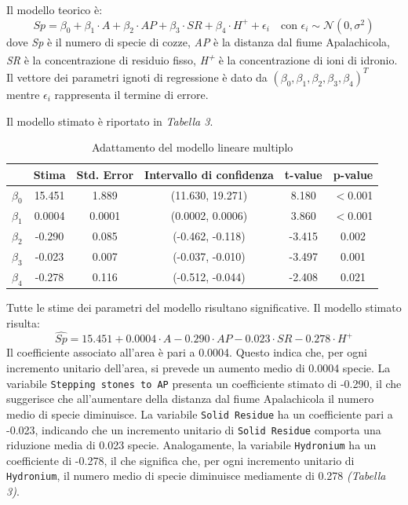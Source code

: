 \documentclass{article} %
\begin{document}
Il modello teorico è:
\[
Sp =\beta_0+\beta_1 \cdot A+\beta_2\cdot AP +\beta_3\cdot SR+\beta_4\cdot H^+ +\epsilon_i \quad \text{con } \epsilon_i \sim \mathcal{N}(0,\sigma^2)
\]
dove \textit{Sp} è il numero di specie di cozze, \textit{AP} è la distanza dal fiume Apalachicola, \textit{SR} è la concentrazione di residuio fisso, \textit{H\textsuperscript{+}} è la concentrazione di ioni di idronio. Il vettore dei parametri ignoti di regressione è dato da $(\beta_0,\beta_1,\beta_2,\beta_3,\beta_4)^T$ mentre $\epsilon_i$ rappresenta il termine di errore. 

Il modello stimato è riportato in \textit{Tabella 3}.

\begin{table}[H]
    \centering
    \renewcommand{\arraystretch}{1.4} %
    \begin{tabular}{lccccc}
        \toprule
        &  Stima &  Std. Error &  Intervallo di confidenza & t-value &  p-value \\
        \midrule  
        $\beta_0$ & 15.451   & 1.889  & (11.630, 19.271) & 8.180  & $<$0.001 \\
        $\beta_1$ & 0.0004   & 0.0001 & (0.0002, 0.0006) & 3.860    & $<$0.001  \\
        $\beta_2$ & -0.290   & 0.085  & (-0.462, -0.118)  & -3.415 & 0.002 \\
        $\beta_3$ & -0.023   & 0.007  & (-0.037, -0.010) & -3.497 & 0.001  \\
        $\beta_4$ & -0.278   & 0.116  & (-0.512, -0.044) & -2.408 & 0.021 \\
        \bottomrule
    \end{tabular}
    \caption{Adattamento del modello lineare multiplo}
\end{table}
Tutte le stime dei parametri del modello risultano significative. 
Il modello stimato risulta:
\[
\hat{Sp}=15.451+0.0004 \cdot A-0.290\cdot AP -0.023\cdot SR-0.278\cdot H^+
\]
Il coefficiente associato  all'area è pari a 0.0004. Questo indica che, per ogni incremento unitario dell'area, si prevede un aumento medio di 0.0004 specie. 
La variabile \texttt{Stepping stones to AP} presenta un coefficiente stimato di -0.290, il che suggerisce che all'aumentare della distanza dal fiume Apalachicola il numero medio di specie diminuisce.
La variabile \texttt{Solid Residue} ha un coefficiente pari a -0.023, indicando che un incremento unitario di \texttt{Solid Residue} comporta una riduzione media di 0.023 specie. Analogamente, la variabile \texttt{Hydronium} ha un coefficiente di -0.278, il che significa che, per ogni incremento unitario di \texttt{Hydronium}, il numero medio di specie diminuisce mediamente di 0.278 \textit{(Tabella 3)}.
\end{document}
